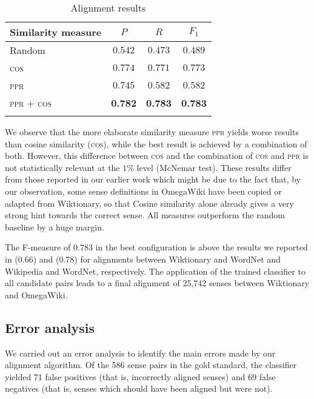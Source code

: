 \documentclass[output=paper]{LSP/langsci}
\begin{document}
\begin{table}
  
\begin{small}
  \begin{tabular}{lccc}
    \lsptoprule
    Similarity measure & $P$ & $R$ & $F_1$ \\
    \midrule
  Random & $0.542$ & $0.473$ & $0.489$ \\
     \textsc{cos} & $0.774$ & $0.771$ & $0.773$ \\
     \textsc{ppr}  & $0.745$ & $0.582$ & $0.582$ \\
     \textsc{ppr + cos}  & \textbf{0.782} &\textbf{0.783} & \textbf{0.783} \\
    \lsptoprule
  \end{tabular}
  \caption{Alignment results}
  \label{tab::validation}
\end{small}
\end{table}

We observe that the more elaborate similarity measure \textsc{ppr} yields worse results than cosine similarity (\textsc{cos}), while the best result is achieved by a combination of both. However, this difference between \textsc{cos} and the combination of \textsc{cos} and \textsc{ppr} is not statistically relevant at the $1\%$ level (McNemar test). These results differ from those reported in our earlier work which might be due to the fact that, by our observation, some sense definitions in OmegaWiki have been copied or adapted from Wiktionary, so that Cosine similarity alone already gives a very strong hint towards the correct sense. All measures outperform the random baseline by a huge margin.

 The F-measure of 0.783 in the best configuration is above the results we reported in \citet{Meyer11a} (0.66) and \citet{Niemann2011} (0.78) for alignments between Wiktionary and WordNet and Wikipedia and WordNet, respectively. 
The application of the trained classifier to all candidate pairs leads to a final alignment of 25,742 senses between Wiktionary and OmegaWiki.

\subsection{Error analysis}

We carried out an error analysis to identify the main errors made by our alignment algorithm. Of the 586 sense pairs in the gold standard, the classifier yielded 71 false positives (that is, incorrectly aligned senses) and 69 false negatives (that is, senses which should have been aligned but were not).
\end{document}
